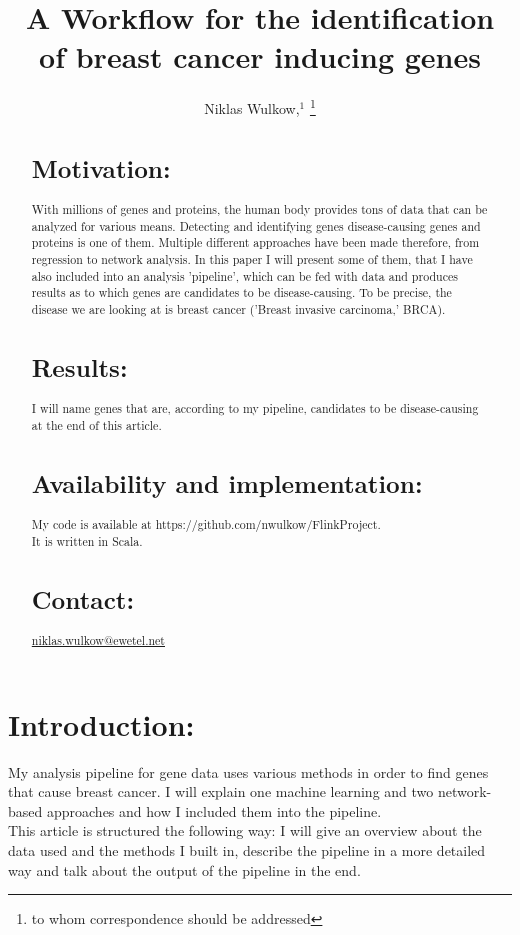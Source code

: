 \documentclass{bioinfo}
\begin{document}

\title[short Title]{A Workflow for the identification of breast cancer inducing genes}
\author[Sample \textit{et~al}]{Niklas Wulkow,$^{1}$
\footnote{to whom correspondence should be addressed}}
\address{$^{1}$Freie Universit{\"a}t Berlin}


\editor{}

\maketitle
\begin{abstract}

\section{Motivation:}
With millions of genes and proteins, the human body provides tons of data that can be analyzed for various means. Detecting and identifying genes disease-causing genes and proteins is one of them. Multiple different approaches have been made therefore, from regression to network analysis. In this paper I will present some of them, that I have also included into an analysis 'pipeline', which can be fed with data and produces results as to which genes are candidates to be disease-causing. To be precise, the disease we are looking at is breast cancer ('Breast invasive carcinoma,' BRCA).

\section{Results:}
I will name genes that are, according to my pipeline, candidates to be disease-causing at the end of this article.

\section{Availability and implementation:}
My code is available at
https://github.com/nwulkow/FlinkProject.\\
It is written in Scala.

\section{Contact:} \href{}{niklas.wulkow@ewetel.net}
\end{abstract}

\section{Introduction:}
My analysis pipeline for gene data uses various methods in order to find genes that cause breast cancer. I will explain one machine learning and two network-based approaches and how I included them into the pipeline.\\
This article is structured the following way: I will give an overview about the data used and the methods I built in, describe the pipeline in a more detailed way and talk about the output of the pipeline in the end. 
\end{document}
